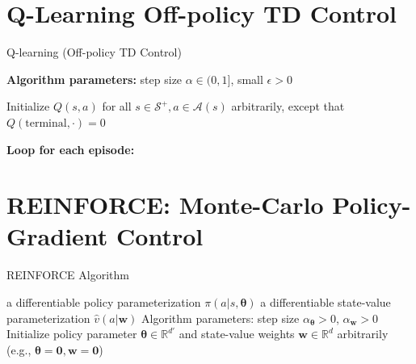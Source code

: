 \documentclass[../xlapes02]{subfiles}
\begin{document}
    \section{Q-Learning Off-policy TD Control}\label{sec:q-learning-off-policy-td-control}
    \begin{algorithm}[H]
        \caption{Q-learning (Off-policy TD Control)}
        \label{alg:q_learning}

        \textbf{Algorithm parameters:} step size $\alpha \in (0, 1]$, small $\epsilon > 0$

        Initialize $Q(s, a)$ for all $s \in \mathcal{S}^+, a \in \mathcal{A}(s)$ arbitrarily, except that $Q(\text{terminal}, \cdot) = 0$

        \textbf{Loop for each episode:}
    \end{algorithm}


    \section{REINFORCE: Monte-Carlo Policy-Gradient Control}\label{sec:reinforce:-monte-carlo-policy-gradient-control}
    \begin{algorithm}[H]
        \caption{REINFORCE Algorithm}
        \label{alg:REINFORCE}

        a differentiable policy parameterization $\pi(a|s, \bm{\theta})$\;
        a differentiable state-value parameterization $\hat{v}(a|\bm{w})$\;
        Algorithm parameters: step size $\alpha_{\bm{\theta}} > 0$, $\alpha_{\bm{w}} > 0$\;
        Initialize policy parameter $\bm{\theta} \in \mathbb{R}^{d'}$ and state-value weights $\bm{w} \in \mathbb{R}^{d}$ arbitrarily (e.g., $\bm{\theta} = \bm{0}, \bm{w} = \bm{0}$)\;

    \end{algorithm}
\end{document}
